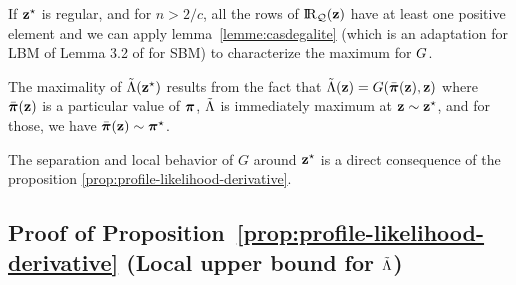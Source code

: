 If $\mathbf{z}^\star$ is regular, and for $n > 2/c$, all the rows of $\RQbz$ have
at least one positive element and we can apply
lemma~\ref{lemme:casdegalite} (which is an adaptation for LBM of Lemma 3.2 of \cite{bickel2013asymptotic} for SBM) to characterize the maximum for
$G$.

The maximality  of $\tilde{\Lambda}(\mathbf{z}^\star)$ results from the fact that $\tilde{\Lambda}(\mathbf{z}) = G(\bar{\boldsymbol{\pi}}(\mathbf{z}), \mathbf{z})$ where
$\bar{\boldsymbol{\pi}}(\mathbf{z})$ is a particular value of $\boldsymbol{\pi}$, $\tilde{\Lambda}$ is
immediately maximum at $\mathbf{z} \sim \mathbf{z}^\star$, and for those, we have $\bar{\boldsymbol{\pi}}(\mathbf{z}) \sim \boldsymbol{\pi}^\star$.

The separation and local behavior of $G$ around $\mathbf{z}^\star$ is a direct consequence of the proposition \ref{prop:profile-likelihood-derivative}.

\proofend

\subsection{Proof of Proposition~\ref{prop:profile-likelihood-derivative} (Local upper bound for  $\tilde{\Lambda}$)}

